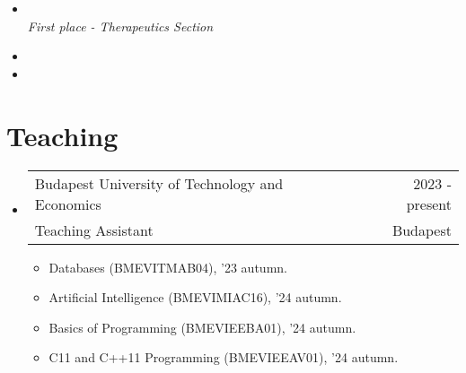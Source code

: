 \documentclass[a4paper,11pt]{article}
\makeatletter
\newcommand{\resumeSubheading}[4]{
\vspace{0.5mm}\item
    \begin{tabular*}{0.98\textwidth}[t]{l@{\extracolsep{\fill}}r}
        #1 & {\small{#4}} \\
        {\small{#3}} &  \small{#2}\\
    \end{tabular*}
    \vspace{-2.4mm}
}
\newcommand{\resumeProject}[4]{
\vspace{0.5mm}\item
    \begin{tabular*}{0.98\textwidth}[t]{l@{\extracolsep{\fill}}r}
        #1 & {\small{#3}} \\
        \small{{#2}} & \small{#4}
    \end{tabular*}
    \vspace{-2.4mm}
}
\newcommand{\resumeSubHeadingListStart}{\begin{itemize}[leftmargin=*,labelsep=0mm,label={}]}
\newcommand{\resumeItemListStart}{\begin{justify}\begin{itemize}[leftmargin=3ex, rightmargin=2ex, noitemsep,labelsep=1.2mm,itemsep=0mm]\small}
\newcommand{\resumeSubHeadingListEnd}{\end{itemize}\vspace{2mm}}
\newcommand{\resumeItemListEnd}{\end{itemize}\end{justify}\vspace{-2mm}}
\makeatother
\begin{document}
\begin{itemize}[label={}, leftmargin=0.2in, itemindent=-0.1in]
  \item {} \\
  \textit{First place - Therapeutics Section}
  \item {}
  \item {}
\end{itemize}

\section{Teaching}

\resumeSubHeadingListStart

\resumeSubheading
{Budapest University of Technology and Economics}{Budapest}
{Teaching Assistant}{2023 - present}
\resumeItemListStart
\item {Databases (BMEVITMAB04), '23 autumn.}
\item {Artificial Intelligence (BMEVIMIAC16), '24 autumn.}
\item {Basics of Programming (BMEVIEEBA01), '24 autumn.}
\item {C11 and C++11 Programming (BMEVIEEAV01), '24 autumn.}
\resumeItemListEnd

\vspace{1.0mm}

\resumeSubHeadingListEnd
\vspace{-8.5mm}



\end{document}
